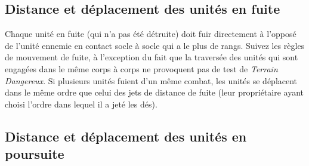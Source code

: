 \subsection*{Distance et déplacement des unités en fuite}
Chaque unité en fuite (qui n'a pas été détruite) doit fuir directement à l'opposé de l'unité ennemie en contact socle à socle qui a le plus de rangs.  Suivez les règles de mouvement de fuite, à l'exception du fait que la traversée des unités qui sont engagées dans le même corps à corps ne provoquent pas de test de \emph{Terrain Dangereux}. Si plusieurs unités fuient d'un même combat, les unités se déplacent dans le même ordre que celui des jets de distance de fuite (leur propriétaire ayant choisi l'ordre dans lequel il a jeté les dés).

\subsection*{Distance et déplacement des unités en poursuite}

